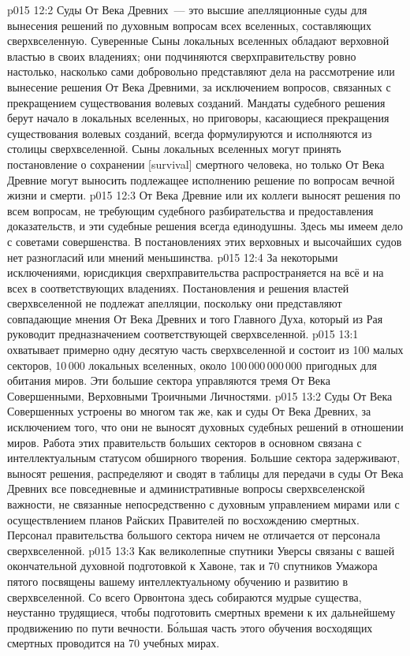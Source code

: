 \vs p015 12:2 Суды От Века Древних~--- это высшие апелляционные суды для вынесения решений по духовным вопросам всех вселенных, составляющих сверхвселенную. Суверенные Сыны локальных вселенных обладают верховной властью в своих владениях; они подчиняются сверхправительству ровно настолько, насколько сами добровольно представляют дела на рассмотрение или вынесение решения От Века Древними, за исключением вопросов, связанных с прекращением существования волевых созданий. Мандаты судебного решения берут начало в локальных вселенных, но приговоры, касающиеся прекращения существования волевых созданий, всегда формулируются и исполняются из столицы сверхвселенной. Сыны локальных вселенных могут принять постановление о сохранении [survival] смертного человека, но только От Века Древние могут выносить подлежащее исполнению решение по вопросам вечной жизни и смерти.
\vs p015 12:3 От Века Древние или их коллеги выносят решения по всем вопросам, не требующим судебного разбирательства и предоставления доказательств, и эти судебные решения всегда единодушны. Здесь мы имеем дело с советами совершенства. В постановлениях этих верховных и высочайших судов нет разногласий или мнений меньшинства.
\vs p015 12:4 За некоторыми исключениями, юрисдикция сверхправительства распространяется на всё и на всех в соответствующих владениях. Постановления и решения властей сверхвселенной не подлежат апелляции, поскольку они представляют совпадающие мнения От Века Древних и того Главного Духа, который из Рая руководит предназначением соответствующей сверхвселенной.
\vs p015 13:1  охватывает примерно одну десятую часть сверхвселенной и состоит из 100 малых секторов, 10\,000 локальных вселенных, около 100\,000\,000\,000 пригодных для обитания миров. Эти большие сектора управляются тремя От Века Совершенными, Верховными Троичными Личностями.
\vs p015 13:2 Суды От Века Совершенных устроены во многом так же, как и суды От Века Древних, за исключением того, что они не выносят духовных судебных решений в отношении миров. Работа этих правительств больших секторов в основном связана с интеллектуальным статусом обширного творения. Большие сектора задерживают, выносят решения, распределяют и сводят в таблицы для передачи в суды От Века Древних все повседневные и административные вопросы сверхвселенской важности, не связанные непосредственно с духовным управлением мирами или с осуществлением планов Райских Правителей по восхождению смертных. Персонал правительства большого сектора ничем не отличается от персонала сверхвселенной.
\vs p015 13:3 Как великолепные спутники Уверсы связаны с вашей окончательной духовной подготовкой к Хавоне, так и 70 спутников Умажора пятого посвящены вашему интеллектуальному обучению и развитию в сверхвселенной. Со всего Орвонтона здесь собираются мудрые существа, неустанно трудящиеся, чтобы подготовить смертных времени к их дальнейшему продвижению по пути вечности. Б\'ольшая часть этого обучения восходящих смертных проводится на 70 учебных мирах.
